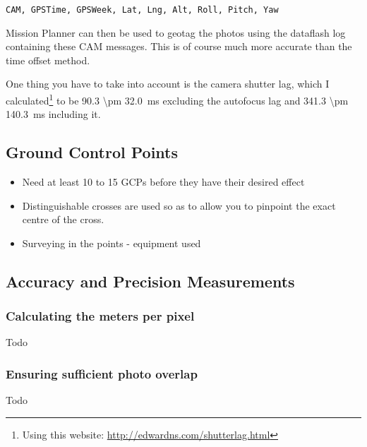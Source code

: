 \begin{verbatim}
CAM, GPSTime, GPSWeek, Lat, Lng, Alt, Roll, Pitch, Yaw
\end{verbatim}

Mission Planner can then be used to geotag the photos using the dataflash log
containing these CAM messages. This is of course much more accurate than the
time offset method.

One thing you have to take into account is the camera shutter lag, which I
calculated\footnote{Using this website:
\url{http://edwardns.com/shutterlag.html}} to be \SI{90.3 \pm
32.0}{ms} excluding the autofocus lag and \SI{341.3 \pm
140.3}{ms} including it.

\subsection{Ground Control Points}

\begin{itemize}

\item Need at least 10 to 15 GCPs before they have their desired effect

\item Distinguishable crosses are used so as to allow you to pinpoint the exact
centre of the cross.

\item Surveying in the points - equipment used

\end{itemize}

\subsection{Accuracy and Precision Measurements}

\subsubsection{Calculating the meters per pixel}

Todo

\subsubsection{Ensuring sufficient photo overlap}

Todo
